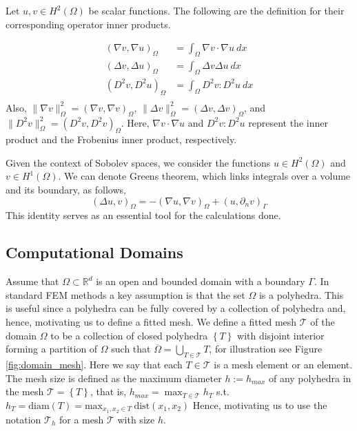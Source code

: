 Let $u,v \in H^{2}(\Omega)$ be scalar functions. The following are the definition for their corresponding operator inner products.

\begin{equation}
\begin{split}
( \nabla v, \nabla u)_{\Omega } & = \int_{\Omega } \nabla v \cdot \nabla u \ dx \\
( \Delta v, \Delta u)_{\Omega } & = \int_{\Omega } \Delta v \Delta u \ dx \\
( D^2 v, D^2 u)_{\Omega } & = \int_{\Omega } D^2 v : D^2 u \ dx \\
\end{split}
\end{equation}
Also, $ \|  \nabla v\|_{  \Omega}^{2} = ( \nabla v, \nabla v)_{\Omega}$, $ \|   \Delta v \|_{\Omega}^{2} = (\Delta v, \Delta v)_{\Omega}$, and $ \| D^2 v \|_{ \Omega}^{2} = (D^2 v, D^2 v)_{\Omega}$.
Here, $\nabla v \cdot \nabla u$ and $D^2 v : D^2 u$ represent the inner product and the Frobenius inner product, respectively.

Given the context of Sobolev spaces, we consider the functions $ u \in H^{2}( \Omega )$ and $ v \in H^{1}( \Omega )$. We can denote Greens theorem, which links integrals over a volume and its boundary, as follows,
\[
( \Delta u, v) _{\Omega } = -( \nabla u, \nabla v)_{\Omega } + ( u, \partial _{n}v)_{\Gamma }
\]
This identity serves as an essential tool for the calculations done.



\subsection{Computational Domains}%
\label{sub:computational_domain}
Assume that $\Omega \subset \mathbb{R} ^{d} $ is an open and bounded domain with a boundary $\Gamma $. In standard FEM methods a key assumption is that the set $\Omega $ is a polyhedra. This is useful since a polyhedra can be fully covered by a collection of polyhedra and, hence, motivating us to define a fitted mesh.
We define a fitted mesh $\mathcal{T} $ of the domain $\Omega $ to be a collection of closed polyhedra $\left\{ T \right\}  $ with disjoint interior forming a partition of $\Omega $ such that $\overline{\Omega } = \bigcup _{T \in \mathcal{T} } T $, for illustration see Figure
\ref{fig:domain_mesh}.
Here we say that each $T \in  \mathcal{T} $ is a mesh element or an element.
The mesh size is defined as the maximum diameter $h := h_{max} $ of any polyhedra in the mesh $\mathcal{T} = \left\{ T \right\}  $, that is, $ h_{max} = \max_{T \in \mathcal{T} }  h_{T}$ s.t.
$h _{T}  = \mathrm{diam}\left( T \right)   = \mathrm{max}_{x_1, x_{2} \in T} \ \mathrm{ dist }(x_{1}, x_{2})$
Hence, motivating us to use the notation $\mathcal{T} _{h}$ for a mesh $\mathcal{T} $ with size $h$.


